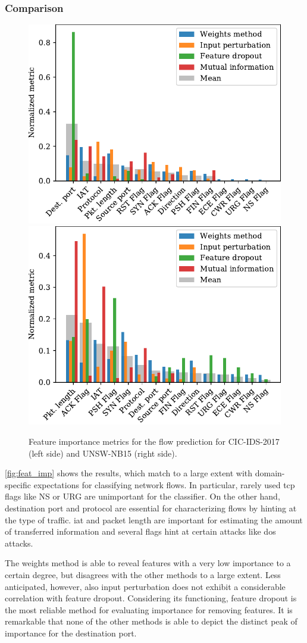 \documentclass[conference]{IEEEtran}
\begin{document}
\subsubsection{Comparison}
\begin{figure}
\includegraphics[width=.49\textwidth]{../plots/importance/feat_imp_flow_2017.pdf}\hspace{.02\textwidth}
\includegraphics[width=.49\textwidth]{../plots/importance/feat_imp_flow_2015.pdf}
\caption{Feature importance metrics for the flow prediction for CIC-IDS-2017 (left side) and UNSW-NB15 (right side).}
\label{fig:feat_imp}
\end{figure}
\autoref{fig:feat_imp} shows the results, which match to a large extent with domain-specific expectations for classifying network flows.
In particular, rarely used \gls{tcp} flags like NS or URG are unimportant for the classifier. On the other hand, destination port and protocol are essential for characterizing flows by hinting at the type of traffic. \gls{iat} and packet length are important for estimating the amount of transferred information and several flags hint at certain attacks like \gls{dos} attacks.

The weights method is able to reveal features with a very low importance to a certain degree, but disagrees with the other methods to a large extent. Less anticipated, however, also input perturbation does not exhibit a considerable correlation with feature dropout. Considering its functioning, feature dropout is the most reliable method for evaluating importance for removing features. It is remarkable that none of the other methods is able to depict the distinct peak of importance for the destination port.
\end{document}
